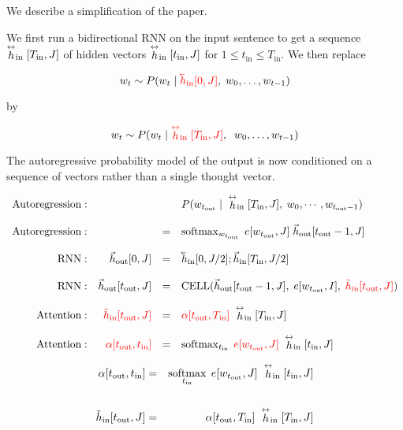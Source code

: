 {\vfill
We describe a simplification of the paper.

We first run a bidirectional RNN on the
input sentence to get a {\color{red} sequence} $\stackrel{\leftrightarrow}{h}_\mathrm{in}[T_{\mathrm{in}},J]$ of hidden vectors $\stackrel{\leftrightarrow}{h}_\mathrm{in}[t_\mathrm{in},J]$ for $1 \leq t_\mathrm{in} \leq T_{\mathrm{in}}$.
We then replace

$$w_t \sim P(w_t\;|\;{\color{red} \cev{h}_{\mathrm{in}}[0,J]},\;w_0,\ldots,w_{t-1})$$

\vfill
by

$$w_t \sim P(w_t\;|\;{\color{red} \stackrel{\leftrightarrow}{h}_\mathrm{in}[T_{\mathrm{in}},J]},\;\;w_0,\ldots,w_{t-1})$$

\vfill
The autoregressive probability model of the output is now conditioned on a sequence of vectors rather than a single thought vector.

{\huge
$$\begin{array}{rrcl}
        \mathrm{Autoregression:}    &    & &    P(w_{t_\mathrm{out}}\;|\;\dvec{h}_\mathrm{in}[T_{\mathrm{in}},J],\;w_0,\cdots,w_{{t_\mathrm{out}}-1}) \\
        \\
        \mathrm{Autoregression:} &   & = & \softmax_{w_{t_\mathrm{out}}}\;e[w_{t_\mathrm{out}},J]\;\vec{h}_\mathrm{out}[t_\mathrm{out}-1,J] \\
   \\
   \mathrm{RNN:} &\vec{h}_\mathrm{out}[0,J] & = & \cev{h}_\mathrm{in}[0,J/2];\vec{h}_\mathrm{in}[T_\mathrm{in},J/2] \\
   \\
  \mathrm{RNN:} & \vec{h}_\mathrm{out}[t_\mathrm{out},J] & = & \mathrm{CELL}(\vec{h}_\mathrm{out}[t_{\mathrm{out}}-1,J],\;e[w_{t_\mathrm{out}},I],\;{\color{red} \tilde{h}_\mathrm{in}[t_\mathrm{out},J]}) \\
  \\
  \mathrm{Attention:} & {\color{red} \tilde{h}_\mathrm{in}[t_\mathrm{out},J]} & = & {\color{red} \alpha[t_\mathrm{out},T_{\mathrm{in}}]}\;\dvec{h}_\mathrm{in}[T_{\mathrm{in}},J] \\
  \\
  \mathrm{Attention:} & {\color{red} \alpha[t_\mathrm{out},t_{\mathrm{in}}]} & =& \softmax_{t_\mathrm{in}} \;{\color{red} e[w_{t_\mathrm{out}},J]}\;\dvec{h}_\mathrm{in}[t_{\mathrm{in}},J]
  \end{array}$$
}

\begin{eqnarray*}
  \alpha[t_\mathrm{out},t_{\mathrm{in}}]& =& \operatorname*{softmax}_{t_\mathrm{in}} \;e[w_{t_\mathrm{out}},J]\;\stackrel{\leftrightarrow}{h}_\mathrm{in}[t_{\mathrm{in}},J] \\
\\
\tilde{h}_\mathrm{in}[t_\mathrm{out},J]& = & \alpha[t_\mathrm{out},T_{\mathrm{in}}]\;\stackrel{\leftrightarrow}{h}_\mathrm{in}[T_{\mathrm{in}},J]
\end{eqnarray*}

}
